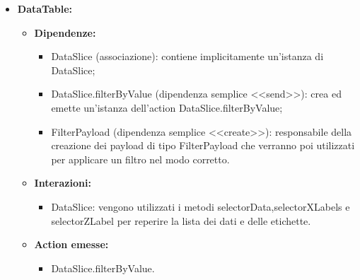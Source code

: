 \begin{itemize}
      \item \textbf{DataTable:}
            \begin{itemize}
                  \item \textbf{Dipendenze:}
                        \begin{itemize}
                              \item DataSlice (associazione): contiene implicitamente un'istanza di DataSlice;
                              \item DataSlice.filterByValue (dipendenza semplice <<send>>): crea ed emette
                                    un'istanza dell'action DataSlice.filterByValue;
                              \item FilterPayload (dipendenza semplice <<create>>): responsabile della creazione
                                    dei payload di tipo FilterPayload che verranno poi utilizzati per applicare un
                                    filtro nel modo corretto.
                        \end{itemize}
                  \item \textbf{Interazioni:}
                        \begin{itemize}
                              \item DataSlice: vengono utilizzati i metodi selectorData,selectorXLabels e
                                    selectorZLabel per reperire la lista dei dati e delle etichette.
                        \end{itemize}
                  \item \textbf{Action emesse:}
                        \begin{itemize}
                              \item DataSlice.filterByValue.
                        \end{itemize}
            \end{itemize}


\end{itemize}
